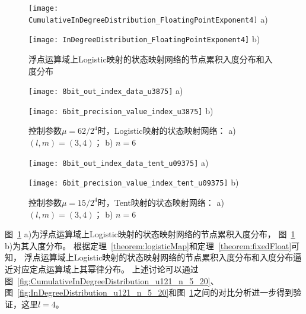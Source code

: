 \begin{figure}[!htb]
\centering
\begin{minipage}{\TwoImW}
\centering
\texttt{[image: CumulativeInDegreeDistribution\_FloatingPointExponent4]}
a)
\end{minipage}
\begin{minipage}{\TwoImW}
\centering
\texttt{[image: InDegreeDistribution\_FloatingPointExponent4]}
b)
\end{minipage}
\caption{浮点运算域上Logistic映射的状态映射网络的节点累积入度分布和入度分布}
\label{fig:CumulativeInDegreeDistribution4}
\end{figure}

\begin{figure}[!htb]
\centering
\begin{minipage}{\BigTwoImW}
\centering
\texttt{[image: 8bit\_out\_index\_data\_u3875]}
a)
\end{minipage}  \hspace{\figsep}
\begin{minipage}{0.98\BigTwoImW}
\centering
\texttt{[image: 6bit\_precision\_value\_index\_u3875]}
b)
\end{minipage}
\caption{控制参数$\mu=62/2^4$时，Logistic映射的状态映射网络：
a) $(l,m)=(3,4)$； b) $n=6$}
\label{fig:networkLogistic8and6bits}
\end{figure}

\begin{figure}[!htb]
\centering
\begin{minipage}{0.97\BigTwoImW}
\centering
\texttt{[image: 8bit\_out\_index\_data\_tent\_u09375]}
a)
\end{minipage}\hspace{\figsep}
\begin{minipage}{\BigTwoImW}
\centering
\texttt{[image: 6bit\_precision\_value\_index\_tent\_u09375]}
b)
\end{minipage}
\caption{控制参数$\mu=15/2^4$时，Tent映射的状态映射网络：
a) $(l,m)=(3,4)$； b) $n=6$}
\label{fig:networkTent8and6bits}
\end{figure}

图~\ref{fig:CumulativeInDegreeDistribution4} a)为浮点运算域上Logistic映射的状态映射网络的节点累积入度分布，
图~\ref{fig:CumulativeInDegreeDistribution4} b)为其入度分布。
根据定理~\ref{theorem:logisticMap}和定理~\ref{theorem:fixedFloat}可知，
浮点运算域上Logistic映射的状态映射网络的节点累积入度分布和入度分布逼近对应定点运算域上其幂律分布。
上述讨论可以通过图~\ref{fig:CumulativeInDegreeDistribution_u121_n_5_20}、图~\ref{fig:InDegreeDistribution_u121_n_5_20}和图~\ref{fig:CumulativeInDegreeDistribution4}之间的对比分析进一步得到验证，这里$l=4$。


